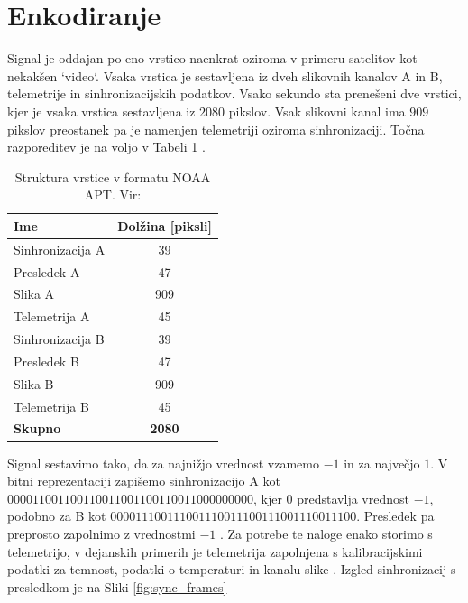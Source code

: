 \documentclass{article}
\begin{document}
\section{Enkodiranje}
Signal je oddajan po eno vrstico naenkrat oziroma v primeru satelitov kot nekakšen `video`. Vsaka vrstica je sestavljena iz dveh slikovnih kanalov A in B, telemetrije in sinhronizacijskih podatkov. Vsako sekundo sta prenešeni dve vrstici, kjer je vsaka vrstica sestavljena iz $2080$ pikslov. Vsak slikovni kanal ima $909$ pikslov preostanek pa je namenjen telemetriji oziroma sinhronizaciji. Točna razporeditev je na voljo v Tabeli \ref{tab:signal_structure} \cite{sigidwiki}.
\begin{table}[H]
\centering
\begin{tabular}{|l|c|}
\hline
\textbf{Ime} & \textbf{Dolžina [piksli]} \\
\hline
Sinhronizacija A      & 39  \\ \hline
Presledek A     & 47  \\ \hline
Slika A     & 909 \\ \hline
Telemetrija A & 45  \\ \hline
Sinhronizacija B      & 39  \\ \hline
Presledek B     & 47  \\ \hline
Slika B     & 909 \\ \hline
Telemetrija B & 45  \\ \hline
\hline
\textbf{Skupno} & \textbf{2080} \\
\hline
\end{tabular}
\caption{Struktura vrstice v formatu NOAA APT. Vir: \cite{sigidwiki}}
\label{tab:signal_structure}
\end{table}
Signal sestavimo tako, da za najnižjo vrednost vzamemo $-1$ in za največjo $1$. V bitni reprezentaciji zapišemo sinhronizacijo A kot $000011001100110011001100110011000000000$, kjer $0$ predstavlja vrednost $-1$, podobno za B kot $000011100111001110011100111001110011100$.  Presledek pa preprosto zapolnimo z vrednostmi $-1$ \cite{sigidwiki}. Za potrebe te naloge enako storimo s telemetrijo, v dejanskih primerih je telemetrija zapolnjena s kalibracijskimi podatki za temnost, podatki o temperaturi in kanalu slike \cite{bernardi}. Izgled sinhronizacij s presledkom je na Sliki \ref{fig:sync_frames}
\end{document}

